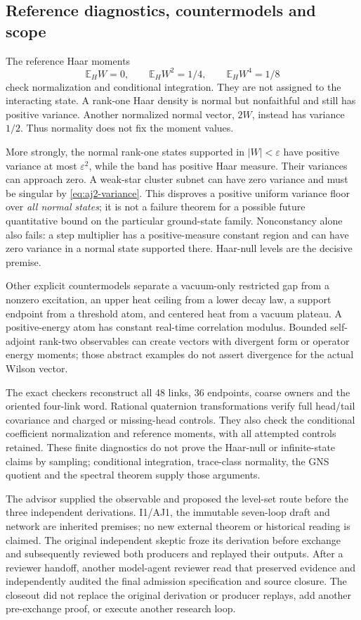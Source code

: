 \subsection{Reference diagnostics, countermodels and scope}
The reference Haar moments
\begin{equation}
 \mathbb E_H W=0,\qquad\mathbb E_H W^2=1/4,
 \qquad\mathbb E_H W^4=1/8
\end{equation}
check normalization and conditional integration. They are not assigned to the interacting state. A rank-one Haar density is normal but nonfaithful and still has positive variance. Another normalized normal vector, $2W$, instead has variance $1/2$. Thus normality does not fix the moment values.

More strongly, the normal rank-one states supported in $|W|<\varepsilon$ have positive variance at most $\varepsilon^2$, while the band has positive Haar measure. Their variances can approach zero. A weak-star cluster subnet can have zero variance and must be singular by \eqref{eq:aj2-variance}. This disproves a positive uniform variance floor over \emph{all normal states}; it is not a failure theorem for a possible future quantitative bound on the particular ground-state family. Nonconstancy alone also fails: a step multiplier has a positive-measure constant region and can have zero variance in a normal state supported there. Haar-null levels are the decisive premise.

Other explicit countermodels separate a vacuum-only restricted gap from a nonzero excitation, an upper heat ceiling from a lower decay law, a support endpoint from a threshold atom, and centered heat from a vacuum plateau. A positive-energy atom has constant real-time correlation modulus. Bounded self-adjoint rank-two observables can create vectors with divergent form or operator energy moments; those abstract examples do not assert divergence for the actual Wilson vector.

The exact checkers reconstruct all 48 links, 36 endpoints, coarse owners and the oriented four-link word. Rational quaternion transformations verify full head/tail covariance and charged or missing-head controls. They also check the conditional coefficient normalization and reference moments, with all attempted controls retained. These finite diagnostics do not prove the Haar-null or infinite-state claims by sampling; conditional integration, trace-class normality, the GNS quotient and the spectral theorem supply those arguments.

The advisor supplied the observable and proposed the level-set route before the three independent derivations. I1/AJ1, the immutable seven-loop draft and network are inherited premises; no new external theorem or historical reading is claimed. The original independent skeptic froze its derivation before exchange and subsequently reviewed both producers and replayed their outputs. After a reviewer handoff, another model-agent reviewer read that preserved evidence and independently audited the final admission specification and source closure. The closeout did not replace the original derivation or producer replays, add another pre-exchange proof, or execute another research loop.

